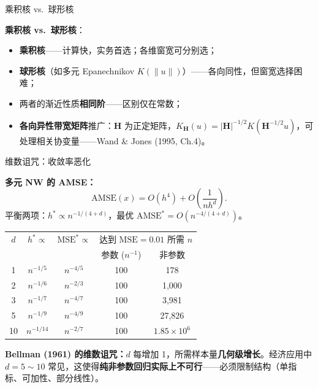 \documentclass[aspectratio=169, 10pt]{beamer}
\renewcommand{\arraystretch}{1.05}
\begin{document}
\begin{frame}{乘积核 vs.\ 球形核}

  \begin{keybox}
    \textbf{乘积核 vs.\ 球形核}：
    \begin{itemize}
      \item \textbf{乘积核}——计算快，实务首选；各维窗宽可分别选；
      \item \textbf{球形核}（如多元 Epanechnikov $K(\|u\|)$）——各向同性，但窗宽选择困难；
      \item 两者的渐近性质\textbf{相同阶}——区别仅在常数；
      \item \textbf{各向异性带宽矩阵}推广：$\mathbf{H}$ 为正定矩阵，$K_\mathbf{H}(u)= |\mathbf{H}|^{-1/2}K(\mathbf{H}^{-1/2}u)$，可处理相关协变量——Wand \& Jones (1995, Ch.4)。
    \end{itemize}
  \end{keybox}

\end{frame}


\begin{frame}{维数诅咒：收敛率恶化}

  \textbf{多元 NW 的 AMSE：}
  \[
    \text{AMSE}(x) = O(h^4) + O\!\left(\frac{1}{n h^d}\right).
  \]
  平衡两项：$h^* \propto n^{-1/(4+d)}$，最优 $\text{AMSE}^* = O(n^{-4/(4+d)})$。

  \centering\small
  \renewcommand{\arraystretch}{1.2}
  \begin{tabular}{@{}ccccc@{}}
    \toprule
    $d$ & $h^* \propto$ & $\text{MSE}^* \propto$ & \multicolumn{2}{c}{达到 $\text{MSE}=0.01$ 所需 $n$} \\
        &              &                        & 参数 ($n^{-1}$)   & 非参数 \\
    \midrule
    1 & $n^{-1/5}$  & $n^{-4/5}$  & 100        & 178      \\
    2 & $n^{-1/6}$  & $n^{-2/3}$  & 100        & 1{,}000   \\
    3 & $n^{-1/7}$  & $n^{-4/7}$  & 100        & 3{,}981   \\
    5 & $n^{-1/9}$  & $n^{-4/9}$  & 100        & 27{,}826  \\
    10 & $n^{-1/14}$ & $n^{-2/7}$  & 100        & $1.85\times 10^6$ \\
    \bottomrule
  \end{tabular}

  \begin{highlightbox}
    \textbf{Bellman (1961) 的维数诅咒：}$d$ 每增加 1，所需样本量\textbf{几何级增长}。经济应用中 $d=5\sim 10$ 常见，这使得\textbf{纯非参数回归实际上不可行}——必须限制结构（单指标、可加性、部分线性）。
  \end{highlightbox}

\end{frame}
\end{document}
